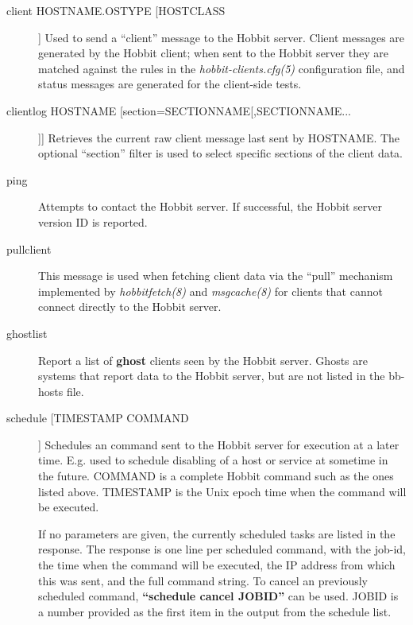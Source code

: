 \begin{description}
 

\item[client HOSTNAME.OSTYPE [HOSTCLASS]] Used to send a ``client''
  message to the Hobbit server. Client messages are generated by the
  Hobbit client; when sent to the Hobbit server they are matched
  against the rules in the \emph{hobbit-clients.cfg(5)} configuration
  file, and status messages are generated for the client-side tests. 


 

\item[clientlog HOSTNAME [section=SECTIONNAME[,SECTIONNAME...]]]
  Retrieves the current raw client message last sent by HOSTNAME. The
  optional ``section'' filter is used to select specific sections of
  the client data. 



\item[ping] Attempts to contact the Hobbit server. If successful, the
  Hobbit server version ID is reported. 


 

\item[pullclient] This message is used when fetching client data via
  the ``pull'' mechanism implemented by \emph{hobbitfetch(8)} and
  \emph{msgcache(8)} for clients that cannot connect directly to the
  Hobbit server. 



\item[ghostlist] Report a list of \textbf{ghost} clients seen by the
  Hobbit server. Ghosts are systems that report data to the Hobbit
  server, but are not listed in the bb-hosts file. 

 

\item[schedule [TIMESTAMP COMMAND]] Schedules an command sent to the
  Hobbit server for execution at a later time. E.g. used to schedule
  disabling of a host or service at sometime in the future. COMMAND is
  a complete Hobbit command such as the ones listed above. TIMESTAMP
  is the Unix epoch time when the command will be executed.  

 If no parameters are given, the currently scheduled tasks are listed
 in the response. The response is one line per scheduled command, with
 the job-id, the time when the command will be executed, the IP
 address from which this was sent, and the full command string.   To
 cancel an previously scheduled command, \textbf{``schedule cancel
 JOBID''} can be used. JOBID is a number provided as the first item in
 the output from the schedule list. 


 


\end{description}

